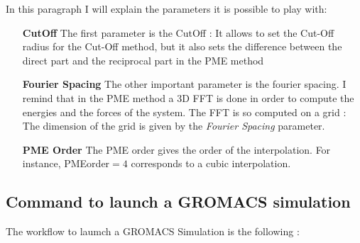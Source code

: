 \documentclass[12pt,twoside,a4paper]{report}
\begin{document}
	In this paragraph I will explain the parameters it is possible to play with:
	
	\begin{enumerate}
	

	\item[\textbf{CutOff}] The first parameter is the CutOff : It allows to set the Cut-Off radius for the Cut-Off method, but it also sets the difference between the direct part and the reciprocal part in the PME method
	
	\item[\textbf{Fourier Spacing}] The other important parameter is the fourier spacing. I remind that in the PME method a 3D FFT is done in order to compute the energies and the forces of the system. The FFT is so computed on a grid : The dimension of the grid is given by the \textit{Fourier Spacing} parameter.
	
	\item[\textbf{PME Order}] The PME order gives the order of the interpolation. For instance, PMEorder$= 4$ corresponds to a cubic interpolation. 		
	
	\end{enumerate}
	
	\subsection{Command to launch a GROMACS simulation }	
	
The workflow to laumch a GROMACS Simulation is the following : 
\end{document}
